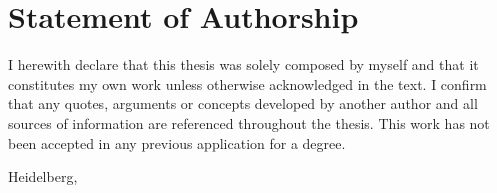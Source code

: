 \makeatletter

\chapter*{Statement of Authorship}

I herewith declare that this thesis was solely composed by myself and that it constitutes my own work unless otherwise acknowledged in the text. I confirm that any quotes, arguments or concepts developed by another author and all sources of information are referenced throughout the thesis. This work has not been accepted in any previous application for a degree.

\vspace{1cm}

\par\noindent%
Heidelberg, \@date \hfill\makebox[2.0in]{\hrulefill}%
\vspace{-\parskip}\par\noindent%
\hfill{}

\makeatother